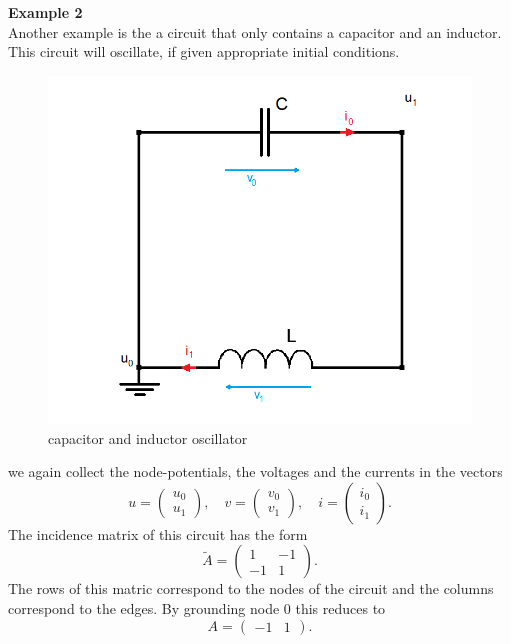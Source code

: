 \textbf{Example 2} \label{ex:LC-circuit incidence matrix} \\
Another example is the a circuit that only contains a capacitor and an inductor. This circuit will oscillate, if given appropriate initial conditions.
\begin{figure}[H]
	\label{circuit:LC-circuit}
	\centering
	\includegraphics[scale=0.5]{pictures/Example2_index0.png}
	\caption{capacitor and inductor oscillator}
\end{figure}

we again collect the node-potentials, the voltages and the currents in the vectors
\begin{displaymath}
	u=
	\left(
	\begin{matrix}
		u_0 \\
		u_1
	\end{matrix}
	\right),
	\quad
	v=
	\left(
	\begin{matrix}
		v_0 \\
		v_1
	\end{matrix}
	\right),
	\quad
	i=
	\left(
	\begin{matrix}
		i_0 \\
		i_1
	\end{matrix}
	\right).
\end{displaymath}
The incidence matrix of this circuit has the form
\begin{displaymath}
	\tilde{A} = 
	\left(
	\begin{matrix}
		1 & -1  \\
		-1 & 1 
	\end{matrix}
	\right).
\end{displaymath}
The rows of this matric correspond to the nodes of the circuit and the columns correspond to the edges. By grounding node 0 this reduces to
\begin{displaymath}
	A = 
	\left(
	\begin{matrix}
		-1 & 1  
	\end{matrix}
	\right).
\end{displaymath}


